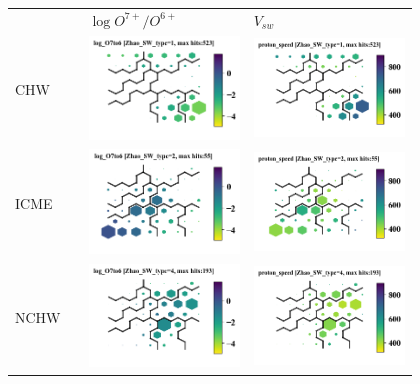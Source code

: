\documentclass[border=0pt,varwidth=20cm,convert={outext=.jpg,density=300}]{standalone}%
\begin{document}
\pagecolor{white}%
\begin{figure}[h!]\centering
	\begin{tabular}{m{2.5cm}CCC}
		& & $\log O^{7+}/O^{6+}$ & $V_{sw}$ \\
		CHW & & \includegraphics[width=4cm]{Roberts/SWtype-Zhao_SW_type-1-log_O7to6} &
		\includegraphics[width=4cm]{Roberts/SWtype-Zhao_SW_type-1-proton_speed}\hfill	\\
		ICME & & \includegraphics[width=4cm]{Roberts/SWtype-Zhao_SW_type-2-log_O7to6} &
		\includegraphics[width=4cm]{Roberts/SWtype-Zhao_SW_type-2-proton_speed}\hfill	\\
		NCHW & & \includegraphics[width=4cm]{Roberts/SWtype-Zhao_SW_type-4-log_O7to6} &
		\includegraphics[width=4cm]{Roberts/SWtype-Zhao_SW_type-4-proton_speed}\hfill \\

\end{tabular}
\end{figure}
\end{document}
